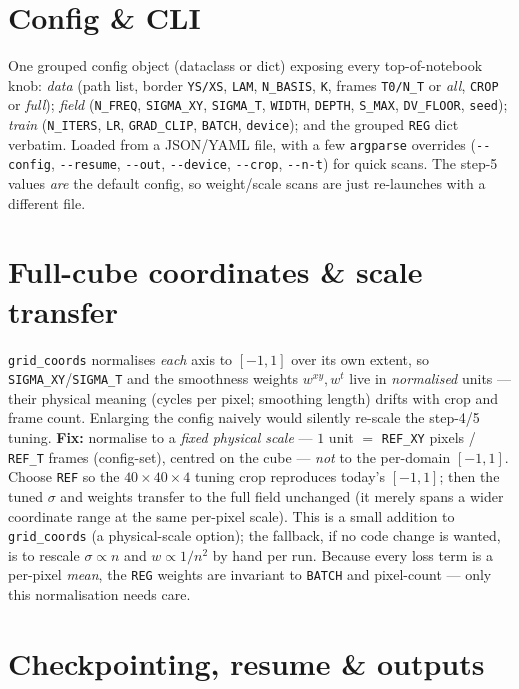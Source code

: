 \documentclass[10pt,a4paper]{article}
\newcommand{\co}[1]{{\small\texttt{#1}}}
\begin{document}
\section{Config \& CLI}

One grouped config object (dataclass or dict) exposing every top-of-notebook knob: \emph{data} (path list, border \co{YS/XS}, \co{LAM}, \co{N\_BASIS}, \co{K}, frames \co{T0/N\_T} or \emph{all}, \co{CROP} or \emph{full}); \emph{field} (\co{N\_FREQ}, \co{SIGMA\_XY}, \co{SIGMA\_T}, \co{WIDTH}, \co{DEPTH}, \co{S\_MAX}, \co{DV\_FLOOR}, \co{seed}); \emph{train} (\co{N\_ITERS}, \co{LR}, \co{GRAD\_CLIP}, \co{BATCH}, \co{device}); and the grouped \co{REG} dict verbatim. Loaded from a JSON/YAML file, with a few \co{argparse} overrides (\co{-{}-config}, \co{-{}-resume}, \co{-{}-out}, \co{-{}-device}, \co{-{}-crop}, \co{-{}-n-t}) for quick scans. The step-5 values \emph{are} the default config, so weight/scale scans are just re-launches with a different file.

\section{Full-cube coordinates \& scale transfer}

\co{grid\_coords} normalises \emph{each} axis to $[-1,1]$ over its own extent, so \co{SIGMA\_XY}/\co{SIGMA\_T} and the smoothness weights $w^{xy},w^{t}$ live in \emph{normalised} units --- their physical meaning (cycles per pixel; smoothing length) drifts with crop and frame count. Enlarging the config naively would silently re-scale the step-4/5 tuning. \textbf{Fix:} normalise to a \emph{fixed physical scale} --- $1$ unit $=$ \co{REF\_XY} pixels / \co{REF\_T} frames (config-set), centred on the cube --- \emph{not} to the per-domain $[-1,1]$. Choose \co{REF} so the $40\times40\times4$ tuning crop reproduces today's $[-1,1]$; then the tuned $\sigma$ and weights transfer to the full field unchanged (it merely spans a wider coordinate range at the same per-pixel scale). This is a small addition to \co{grid\_coords} (a physical-scale option); the fallback, if no code change is wanted, is to rescale $\sigma\!\propto\!n$ and $w\!\propto\!1/n^2$ by hand per run. Because every loss term is a per-pixel \emph{mean}, the \co{REG} weights are invariant to \co{BATCH} and pixel-count --- only this normalisation needs care.

\section{Checkpointing, resume \& outputs}
\end{document}
